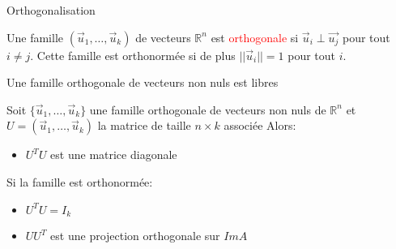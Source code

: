 \begin{parag}{Orthogonalisation}
    \begin{definition}
     Une famille $(\vec{u}_1, \dots, \vec{u}_k)$ de vecteurs $\mathbb{R}^n$ est \textcolor{red}{orthogonale} si $\vec{u}_i \perp \vec{u_j}$ pour tout $i \neq j$. Cette famille est orthonormée si de plus $||\vec{u}_i|| = 1$ pour tout $i$.
    \end{definition}
    \begin{truc}
        Une famille orthogonale de vecteurs non nuls est libres
    \end{truc}
    \begin{truc}
        Soit $\{\vec{u}_1, \dots, \vec{u}_k\}$ une famille orthogonale de vecteurs non nuls de $\mathbb{R}^n$ et $U = (\vec{u}_1, \dots,\vec{u}_k)$ la matrice de taille $n\times k$ associée Alors:
        \begin{itemize}
            \item $U^TU$ est une matrice diagonale
        \end{itemize}
        Si la famille est orthonormée:
        \begin{itemize}
            \item $U^TU= I_k$
            \item $UU^T$ est une projection orthogonale sur $ImA$
        \end{itemize}
    \end{truc}
\end{parag}